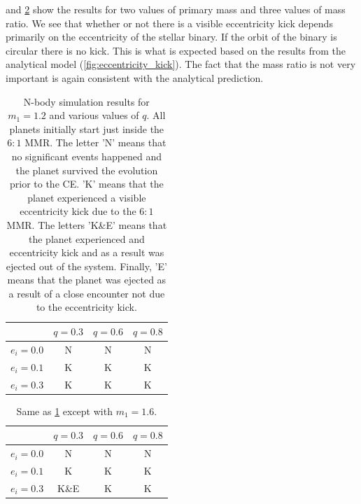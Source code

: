 \documentclass[twoside,openright,titlepage,numbers=noenddot,headinclude,%
                footinclude=true,cleardoublepage=empty,abstractoff, 
                BCOR=5mm,paper=a4,fontsize=11pt,%
                american,%
                ]{scrreprt}%
\begin{document}
 and \cref{table:results_2} show the results for two values 
of primary mass and three values of mass ratio. We see that whether or not there
is a visible eccentricity kick depends primarily on the eccentricity of the
stellar binary. If the orbit of the binary is circular there is no kick. This
is what is expected based on the results from the analytical model
(\cref{fig:eccentricity_kick}).
The fact that
the mass ratio is not very important is again consistent with the analytical
prediction. 

\begin{table}[h]
\centering
\begin{tabular}{lccc}
\toprule
    & $q=0.3$ & $q=0.6$ & $q=0.8$\\
\midrule
    $e_i=0.0$ & N & N & N\\
    $e_i=0.1$ & K & K & K\\
    $e_i=0.3$ & K & K & K\\
\bottomrule
\end{tabular}
    \caption[N-body simulation results for $m_1=1.2$.]{N-body simulation 
    results for $m_1=1.2$ and various values of $q$. All planets initially  
    start just inside the $6:1$ MMR. The letter 'N' means that no significant events
    happened and the planet survived the evolution prior to the CE. 
    'K' means that the planet experienced a 
    visible eccentricity kick due to the $6:1$
    MMR. The letters 'K\&E' means that the planet 
    experienced and eccentricity
    kick and as a result was ejected out of the system. Finally, 'E' 
    means that the
    planet was ejected as a result of a close encounter not due to 
    the eccentricity kick.}
\label{table:results_1}
\end{table}
\begin{table}[h]
\centering
\begin{tabular}{lccc}
\toprule
    & $q=0.3$ & $q=0.6$ & $q=0.8$\\
\midrule
    $e_i=0.0$ & N & N & N\\
    $e_i=0.1$ & K & K & K\\
    $e_i=0.3$ & K\&E & K & K\\
\bottomrule
\end{tabular}
    \caption[N-body simulation results for $m_1=1.2$.]{Same as 
    \cref{table:results_1} 
    except with $m_1=1.6$.}
    \label{table:results_2}
\end{table}
\end{document}
